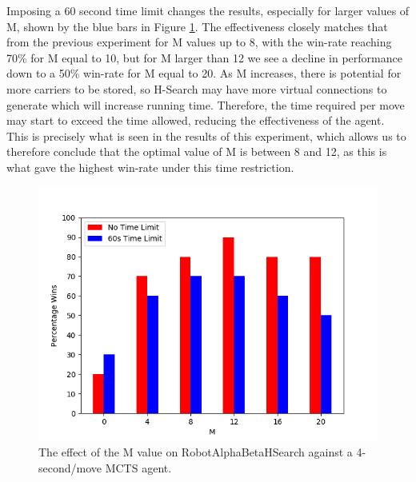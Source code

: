 Imposing a 60 second time limit changes the results, especially for larger values of M, shown by the blue bars in Figure \ref{fig:hsearch_m_perf}. The effectiveness closely matches that from the previous experiment for M values up to 8, with the win-rate reaching 70\% for M equal to 10, but for M larger than 12 we see a decline in performance down to a 50\% win-rate for M equal to 20. As M increases, there is potential for more carriers to be stored, so H-Search may have more virtual connections to generate which will increase running time. Therefore, the time required per move may start to exceed the time allowed, reducing the effectiveness of the agent. This is precisely what is seen in the results of this experiment, which allows us to therefore conclude that the optimal value of M is between 8 and 12, as this is what gave the highest win-rate under this time restriction.

\begin{figure}
    \centering
    \includegraphics[scale = 0.6]{images/HSEARCHM_PERF.png}
    \caption{The effect of the M value on RobotAlphaBetaHSearch against a 4-second/move MCTS agent.}
    \label{fig:hsearch_m_perf}
\end{figure}










